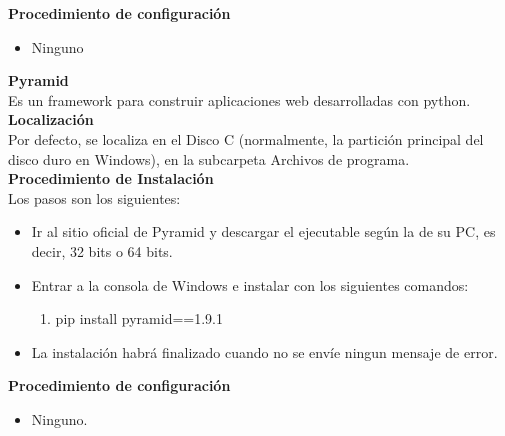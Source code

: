 \textbf{Procedimiento de configuración}
\begin{itemize}
    \item Ninguno
\end{itemize}
\textbf{Pyramid}
\\
Es un framework para construir aplicaciones web desarrolladas con python.
\\
\textbf{Localización}
\\
Por defecto, se localiza en el Disco C (normalmente, la partición principal del 
disco duro en Windows), en la subcarpeta Archivos de programa.
\\
\textbf{Procedimiento de Instalación}
\\
Los pasos son los siguientes:
\begin{itemize}
    \item Ir al sitio oficial de Pyramid y descargar el ejecutable según la 
    de su PC, es decir, 32 bits o 64 bits.
    \item Entrar a la consola de Windows e instalar con los siguientes comandos:
    \begin{enumerate}
        \item pip install pyramid==1.9.1
    \end{enumerate}
    \item La instalación habrá finalizado cuando no se envíe ningun mensaje de error.
\end{itemize}

\textbf{Procedimiento de configuración}
\begin{itemize}
    \item Ninguno.
\end{itemize}